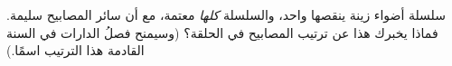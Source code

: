 \begin{exercise}[$\star\star$]\label{exo:g3:first-electric-circuit:11}
سلسلة أضواء زينة ينقصها  واحد، والسلسلة \emph{كلها} معتمة،
مع أن سائر المصابيح سليمة. فماذا يخبرك هذا عن ترتيب المصابيح في
الحلقة؟ (وسيمنح فصلُ الدارات في السنة القادمة هذا الترتيب
اسمًا.)
\end{exercise}
